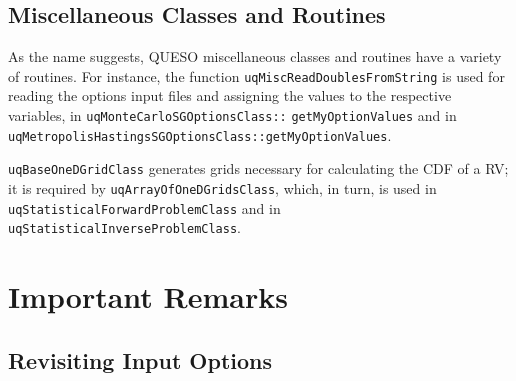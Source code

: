 \section{Miscellaneous Classes and Routines}
 
As the name suggests, QUESO miscellaneous classes and routines have a variety of routines.
For instance, the function \verb+uqMiscReadDoublesFromString+ is used for reading the options input files and assigning the values to the respective variables, in \texttt{uqMonteCarloSGOptionsClass::} \texttt{getMyOptionValues} and in \verb+uqMetropolisHastingsSGOptionsClass::getMyOptionValues+. 

\verb+uqBaseOneDGridClass+ generates grids necessary for calculating the CDF of a RV; it is required by \verb+uqArrayOfOneDGridsClass+, which, in turn, is used in \verb+uqStatisticalForwardProblemClass+ and in \verb+uqStatisticalInverseProblemClass+.

% 
% 
% 



\chapter{Important Remarks}


\section{Revisiting Input Options}

